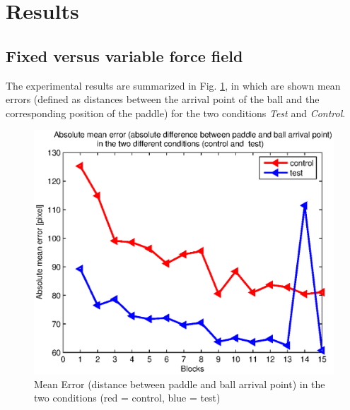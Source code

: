 \section{Results} 

\subsection{Fixed versus variable force field} \label{first_phase}

The experimental results are summarized in Fig. \ref{figTC}, 
in which are shown mean errors (defined as distances between the arrival point of the ball and the corresponding position of the paddle) for the two conditions \textit{Test} and \textit{Control}.

\begin{figure}[tb]
	\centering
		\includegraphics [width=15cm] {fig/TC.eps}
	\caption{Mean Error (distance between paddle and ball arrival point) in the two conditions (red = control, blue = test)}
	\label{figTC}
\end{figure}

